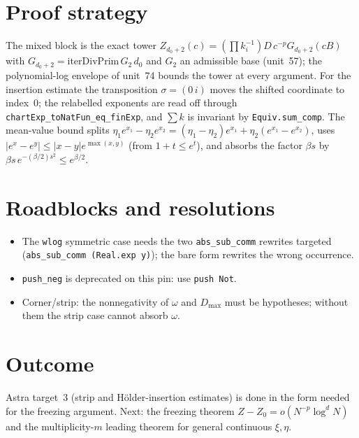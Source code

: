 \documentclass[11pt]{article}
\begin{document}
\section{Proof strategy}
The mixed block is the exact tower $Z_{d_0+2}(c)=(\prod k_i^{-1})D\,c^{-p}G_{d_0+2}(cB)$ with
$G_{d_0+2}=\mathrm{iterDivPrim}\,G_2\,d_0$ and $G_2$ an admissible base (unit~57); the polynomial-log
envelope of unit~74 bounds the tower at every argument. For the insertion estimate the transposition
$\sigma=(0\,i)$ moves the shifted coordinate to index~$0$; the relabelled exponents are read off
through \texttt{chartExp\_toNatFun\_eq\_finExp}, and $\sum k$ is invariant by
\texttt{Equiv.sum\_comp}. The mean-value bound splits
$\eta_1e^{x_1}-\eta_2e^{x_2}=(\eta_1-\eta_2)e^{x_1}+\eta_2(e^{x_1}-e^{x_2})$, uses
$|e^{x}-e^{y}|\le|x-y|e^{\max(x,y)}$ (from $1+t\le e^t$), and absorbs the factor $\beta s$ by
$\beta s\,e^{-(\beta/2)s^2}\le e^{\beta/2}$.

\section{Roadblocks and resolutions}
\begin{itemize}
\item The \texttt{wlog} symmetric case needs the two \texttt{abs\_sub\_comm} rewrites targeted
(\texttt{abs\_sub\_comm (Real.exp y)}); the bare form rewrites the wrong occurrence.
\item \texttt{push\_neg} is deprecated on this pin: use \texttt{push Not}.
\item Corner/strip: the nonnegativity of $\omega$ and $D_{\max}$ must be hypotheses; without them the
strip case cannot absorb $\omega$.
\end{itemize}

\section{Outcome}
Astra target~3 (strip and H\"older-insertion estimates) is done in the form needed for the freezing
argument. Next: the freezing theorem $Z-Z_0=o(N^{-p}\log^dN)$ and the multiplicity-$m$ leading
theorem for general continuous $\xi,\eta$.
\end{document}
